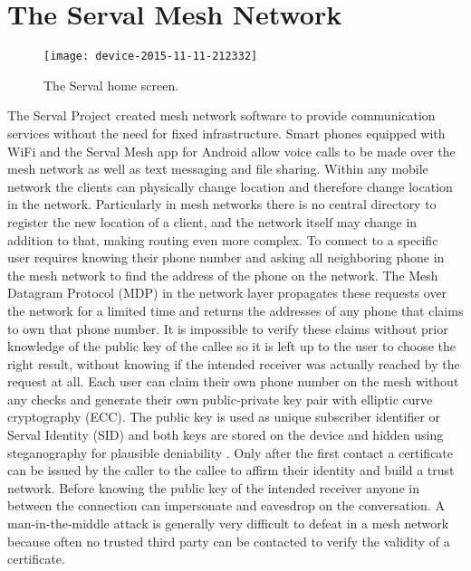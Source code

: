\documentclass[conference,compsoc]{IEEEtran}
\begin{document}
\section{The Serval Mesh Network}

\begin{figure}[b!]
\centering
\texttt{[image: device-2015-11-11-212332]}
\caption{The Serval home screen.}
\label{fig_serval}
\end{figure}

The Serval Project created mesh network software to provide communication services without the need for fixed infrastructure.
Smart phones equipped with WiFi and the Serval Mesh app for Android allow voice calls to be made over the mesh network as well as text messaging and file sharing.
Within any mobile network the clients can physically change location and therefore change location in the network.
Particularly in mesh networks there is no central directory to register the new location of a client, and the network itself may change in addition to that, making routing even more complex.
To connect to a specific user requires knowing their phone number and asking all neighboring phone in the mesh network to find the address of the phone on the network.
The Mesh Datagram Protocol (MDP) in the network layer propagates these requests over the network for a limited time and returns the addresses of any phone that claims to own that phone number.
It is impossible to verify these claims without prior knowledge of the public key of the callee so it is left up to the user to choose the right result, without knowing if the intended receiver was actually reached by the request at all.
Each user can claim their own phone number on the mesh without any checks and generate their own public-private key pair with elliptic curve cryptography (ECC).
The public key is used as unique subscriber identifier or Serval Identity (SID) and both keys are stored on the device and hidden using steganography for plausible deniability  \cite{bettison2014servaldna}.
Only after the first contact a certificate can be issued by the caller to the callee to affirm their identity and build a trust network.
Before knowing the public key of the intended receiver anyone in between the connection can impersonate and eavesdrop on the conversation.
A man-in-the-middle attack is generally very difficult to defeat in a mesh network because often no trusted third party can be contacted to verify the validity of a certificate.
\end{document}

